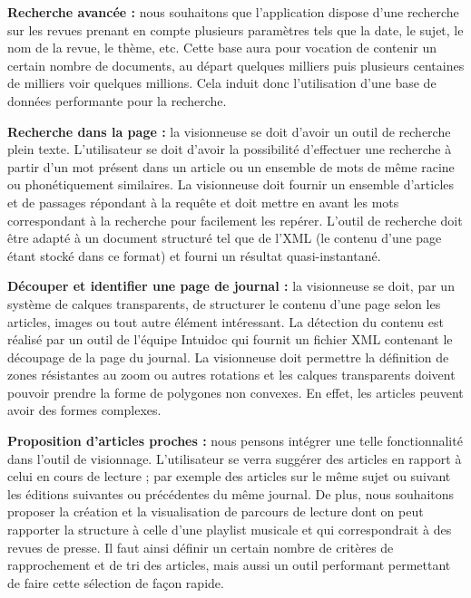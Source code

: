     \textbf{Recherche avancée :} nous souhaitons que l’application dispose d’une recherche sur les revues prenant en compte plusieurs paramètres
    tels que la date, le sujet, le nom de la revue, le thème, etc. Cette base aura pour vocation de contenir un certain nombre de documents, au
    départ quelques milliers puis plusieurs centaines de milliers voir quelques millions. Cela induit donc l’utilisation d’une base de données
    performante pour la recherche.

    \textbf{Recherche dans la page :} la visionneuse se doit d’avoir un outil de recherche plein texte. L'utilisateur se doit d’avoir la possibilité
    d’effectuer une recherche à partir d’un mot présent dans un article ou un ensemble de mots de même racine ou phonétiquement similaires.
    La visionneuse doit fournir un ensemble d’articles et de passages répondant à la requête et doit mettre en avant les mots correspondant à la recherche pour facilement les repérer.
    L’outil de recherche doit être adapté à un document structuré tel que de l’XML (le contenu d’une page étant stocké dans ce format) et fourni
    un résultat quasi-instantané.


    \textbf{Découper et identifier une page de journal :} la visionneuse se doit, par un système de calques transparents, de structurer le contenu d’une page selon
    les articles, images ou tout autre élément intéressant. La détection du contenu est réalisé par un outil de l’équipe Intuidoc qui fournit un
    fichier XML contenant le découpage de la page du journal. La visionneuse doit permettre la définition de zones résistantes au zoom ou autres
    rotations et les calques transparents doivent pouvoir prendre la forme de polygones non convexes. En effet, les articles peuvent avoir des formes complexes.


    \textbf{Proposition d’articles proches :} nous pensons intégrer une telle fonctionnalité dans l’outil de visionnage. L'utilisateur se verra
    suggérer des articles en rapport à celui en cours de lecture ; par exemple des articles sur le même sujet ou suivant les éditions suivantes ou précédentes
    du même journal. De plus, nous souhaitons proposer la création et la visualisation de parcours de lecture dont on peut rapporter la structure
    à celle d’une playlist musicale et qui correspondrait à des revues de presse. Il faut ainsi définir un certain nombre de critères de rapprochement
    et de tri des articles, mais aussi un outil performant permettant de faire cette sélection de façon rapide.


